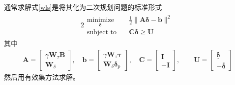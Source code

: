 通常求解式\eqref{wls}是将其化为二次规划问题的标准形式\cite{Nocedal_2006}
\begin{alignat}{2}
\begin{split}
\mathop {{\text{minimize}}}\limits_{\bm{\delta}}\quad&{  \frac{1}{2}\|\bm{A} \bm{\delta}-\bm{b}\|^{2}   } \\
\mbox{subject to}\quad
&  \bm{C}\bm{\delta} \geq \bm{U}
\end{split} 
\end{alignat}
其中
\begin{align*}
\bm{A}=\left[ \begin{array}{c}
\gamma \bm{W}_{\tau} \bm{B} \\
\bm{W}_{\delta}
\end{array}\right] , \quad 
\bm{b}=\left[ \begin{array}{c}
\gamma \bm{W}_{\tau} \bm{\tau} \\
\bm{W}_{\delta} \bm{\delta}_{p}
\end{array}\right] , \quad 
\bm{C}=\left[ \begin{array}{c}
\bm{I} \\
-\bm{I}
\end{array}\right] ,\quad
\quad \bm{U}=\left[ \begin{array}{c}
\underline{\bm{\delta}} \\
-\overline{\bm{\delta}}
\end{array}\right]
\end{align*}
然后用有效集方法求解\cite{Smeur_2017,Harkegard_2002}。
